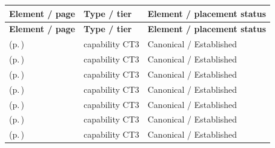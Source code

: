 \begingroup\small\setlength{\TableWidth}{\dimexpr\linewidth-6\tabcolsep-4\arrayrulewidth\relax}
\begin{longtable}{|>{\raggedright\arraybackslash}p{0.52\TableWidth}|>{\raggedright\arraybackslash}p{0.2\TableWidth}|>{\raggedright\arraybackslash}p{0.28\TableWidth}|}
\hline\rowcolor{TableHead}\textbf{Element / page} & \textbf{Type / tier} & \textbf{Element / placement status}\\\hline\endfirsthead
\hline\rowcolor{TableHead}\textbf{Element / page} & \textbf{Type / tier} & \textbf{Element / placement status}\\\hline\endhead
\hline\endfoot
\nameref{cap:bc-health-information-data-management} (p.\,\pageref{cap:bc-health-information-data-management}) & capability CT3 & Canonical / Established\\\hline
\nameref{cap:bc-health-information-structure-management} (p.\,\pageref{cap:bc-health-information-structure-management}) & capability CT3 & Canonical / Established\\\hline
\nameref{cap:bc-health-information-lifecycle-management} (p.\,\pageref{cap:bc-health-information-lifecycle-management}) & capability CT3 & Canonical / Established\\\hline
\nameref{cap:bc-health-information-catalogue-and-index-management} (p.\,\pageref{cap:bc-health-information-catalogue-and-index-management}) & capability CT3 & Canonical / Established\\\hline
\nameref{cap:bc-health-information-compartmentalisation} (p.\,\pageref{cap:bc-health-information-compartmentalisation}) & capability CT3 & Canonical / Established\\\hline
\nameref{cap:bc-health-information-data-correlation} (p.\,\pageref{cap:bc-health-information-data-correlation}) & capability CT3 & Canonical / Established\\\hline
\nameref{cap:bc-health-information-data-retrieval} (p.\,\pageref{cap:bc-health-information-data-retrieval}) & capability CT3 & Canonical / Established\\\hline
\end{longtable}\endgroup

